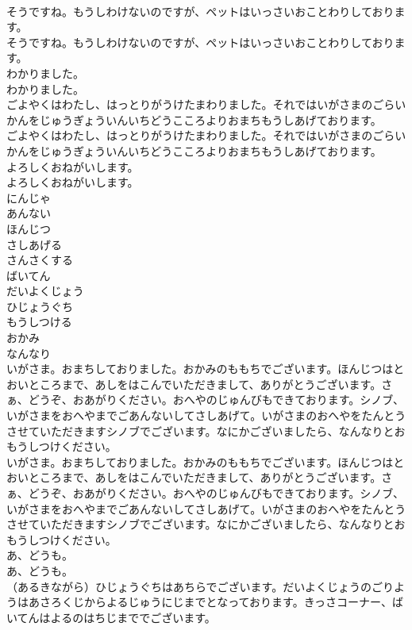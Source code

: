 \documentclass[8pt]{extreport}
\begin{document}
\begin{CJK}{UTF8}{min}
\\	そうですね。もうしわけないのですが、ペットはいっさいおことわりしております。	
\\	そうですね。もうしわけないのですが、ペットはいっさいおことわりしております。 
\\	わかりました。	
\\	わかりました。 
\\	ごよやくはわたし、はっとりがうけたまわりました。それではいがさまのごらいかんをじゅうぎょういんいちどうこころよりおまちもうしあげております。	
\\	ごよやくはわたし、はっとりがうけたまわりました。それではいがさまのごらいかんをじゅうぎょういんいちどうこころよりおまちもうしあげております。 
\\	よろしくおねがいします。	
\\	よろしくおねがいします。 
\\	にんじゃ
\\	あんない
\\	ほんじつ
\\	さしあげる
\\	さんさくする
\\	ばいてん
\\	だいよくじょう
\\	ひじょうぐち
\\	もうしつける
\\	おかみ
\\	なんなり
\\	いがさま。おまちしておりました。おかみのももちでございます。ほんじつはとおいところまで、あしをはこんでいただきまして、ありがとうございます。さぁ、どうぞ、おあがりください。おへやのじゅんびもできております。シノブ、いがさまをおへやまでごあんないしてさしあげて。いがさまのおへやをたんとうさせていただきますシノブでございます。なにかございましたら、なんなりとおもうしつけください。	
\\	いがさま。おまちしておりました。おかみのももちでございます。ほんじつはとおいところまで、あしをはこんでいただきまして、ありがとうございます。さぁ、どうぞ、おあがりください。おへやのじゅんびもできております。シノブ、いがさまをおへやまでごあんないしてさしあげて。いがさまのおへやをたんとうさせていただきますシノブでございます。なにかございましたら、なんなりとおもうしつけください。 
\\	あ、どうも。	
\\	あ、どうも。 
\\	（あるきながら）ひじょうぐちはあちらでございます。だいよくじょうのごりようはあさろくじからよるじゅうにじまでとなっております。きっさコーナー、ばいてんはよるのはちじまででございます。	

\end{CJK}
\end{document}
